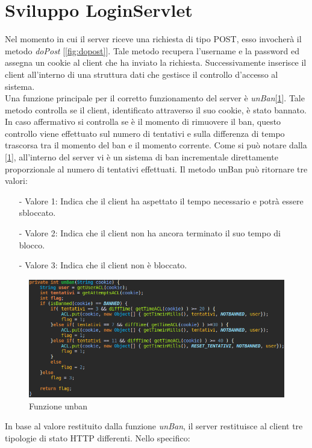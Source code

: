 \documentclass[a4paper,12pt,titlepage,oneside,openany]{book}
\begin{document}
\section{Sviluppo LoginServlet}
Nel momento in cui il server riceve una richiesta di tipo POST, esso invocherà il metodo \textit{doPost} [\ref{fig:dopost}]. 
Tale metodo recupera l'username e la password ed assegna un cookie al client che ha inviato la richiesta. Successivamente inserisce il client all'interno di una struttura dati che gestisce il controllo d'accesso al sistema.\\
Una funzione principale per il corretto funzionamento del server è \textit{unBan}[\ref{fig:unban}]. Tale metodo controlla se il client, identificato attraverso il suo cookie, è stato bannato. In caso affermativo si controlla se è il momento di rimuovere il ban, questo controllo viene effettuato sul numero di tentativi e sulla differenza di tempo trascorsa tra il momento del ban e il momento corrente.
Come si può notare dalla [\ref{fig:unban}], all'interno del server vi è un sistema di ban incrementale direttamente  proporzionale al numero di tentativi effettuati. Il metodo unBan può ritornare tre valori:
\begin{itemize}
	\item[-] Valore 1: Indica che il client ha aspettato il tempo necessario e potrà essere sbloccato.
	\item[-] Valore 2: Indica che il client non ha ancora terminato il suo tempo di blocco.
	\item[-] Valore 3: Indica che il client non è bloccato.
\end{itemize}
\begin{figure}[H]
	\centering
	\includegraphics[scale=0.5]{unban.png}
	\caption{Funzione unban}
	\label{fig:unban}
\end{figure}
In base al valore restituito dalla funzione \textit{unBan}, il server restituisce al client tre tipologie di stato HTTP differenti. Nello specifico:
\end{document}
